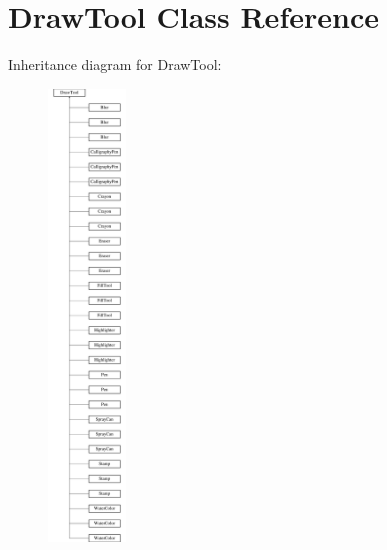 \hypertarget{classDrawTool}{\section{Draw\-Tool Class Reference}
\label{classDrawTool}
}
Inheritance diagram for Draw\-Tool\-:\begin{figure}[H]
\begin{center}
\leavevmode
\includegraphics[height=12.000000cm]{classDrawTool}
\end{center}
\end{figure}

